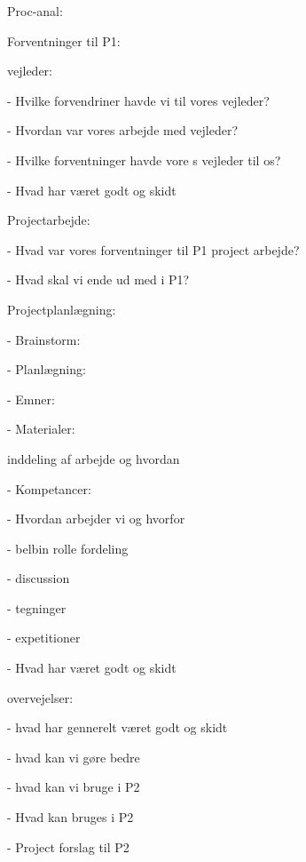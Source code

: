 Proc-anal:

Forventninger til P1:

vejleder:

- Hvilke forvendriner havde vi til vores vejleder?

- Hvordan var vores arbejde med vejleder?

- Hvilke forventninger havde vore s vejleder til os?

- Hvad har været godt og skidt

Projectarbejde:

- Hvad var vores forventninger til P1 project arbejde? 

- Hvad skal vi ende ud med i P1?

Projectplanlægning:

	- Brainstorm:

	- Planlægning:

	- Emner:

	- Materialer:


inddeling af arbejde og hvordan

    - Kompetancer:

    - Hvordan arbejder  vi og hvorfor 

      - belbin rolle fordeling

      - discussion

      - tegninger

      - expetitioner
      
      - Hvad har været godt og skidt


overvejelser:

- hvad har gennerelt været godt og skidt

- hvad kan vi gøre bedre

- hvad kan vi bruge i P2

- Hvad kan bruges i P2

- Project  forslag til P2


